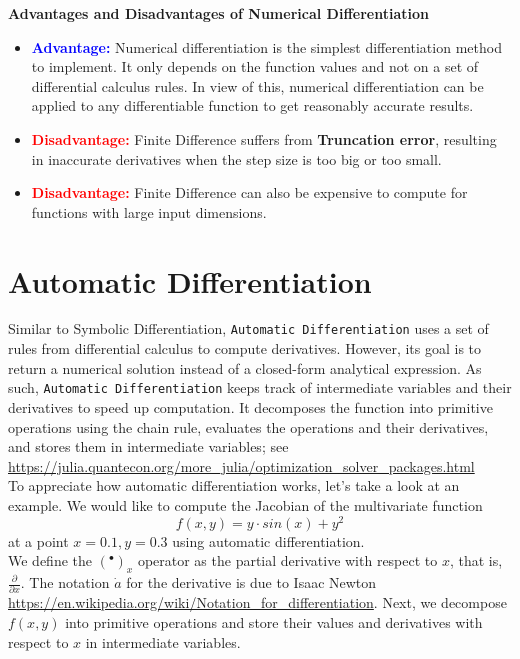 \begin{center}
\bf Advantages and Disadvantages of Numerical Differentiation
\end{center}

\begin{itemize}
    \item \textcolor{blue}{\bf Advantage:} Numerical differentiation is the simplest differentiation method to implement. It only depends on the function values and not on a set of differential calculus rules.
 In view of this, numerical differentiation can be applied to any differentiable function to get reasonably accurate results.

    \item \textcolor{red}{\bf Disadvantage:} Finite Difference suffers from \textbf{Truncation error}, resulting in inaccurate derivatives when the step size is too big or too small.

 \item \textcolor{red}{\bf Disadvantage:} Finite Difference can also be expensive to compute for functions with large input dimensions.
\end{itemize}

\section{Automatic Differentiation}

Similar to Symbolic Differentiation, \texttt{Automatic Differentiation} uses a set of rules from differential calculus to compute derivatives. However, its goal is to return a numerical solution instead of a closed-form analytical expression. As such, \texttt{Automatic Differentiation} keeps track of intermediate variables and their derivatives to speed up computation. It decomposes the function into primitive operations using the chain rule, evaluates the operations and their derivatives, and stores them in intermediate variables; see \url{https://julia.quantecon.org/more_julia/optimization_solver_packages.html}\\

To appreciate how automatic differentiation works, let's take a look at an example. We would like to compute the Jacobian of the multivariate function $$f(x,y) = y\cdot sin(x) + y^2$$ at a point $x=0.1, y=0.3$ using automatic differentiation.\\

We define the $(^\bullet)_x$ operator as the partial derivative with respect to $x$, that is, $\frac{\partial}{\partial x}$. The notation $\dot{a}$ for the derivative is due to Isaac Newton \url{https://en.wikipedia.org/wiki/Notation_for_differentiation}. Next, we decompose $f(x,y)$ into primitive operations and store their values and derivatives with respect to $x$ in intermediate variables. \\

